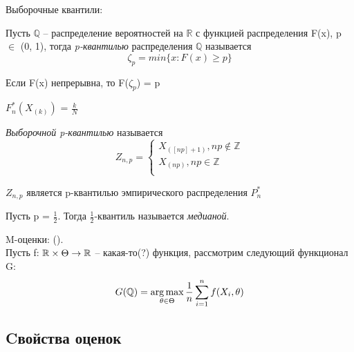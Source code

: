 \begin{example}
Выборочные квантили: 
\begin{definition}
Пусть $\mathbb{Q}$ -- распределение вероятностей на $\mathbb{R}$ с функцией распределения F(x), p $\in$ (0, 1), тогда \emph{p-квантилью} распределения $\mathbb{Q}$ называется 
$$ \zeta_p = min\{x: F(x) \geq p\}$$

\begin{remark}
Если F(x) непрерывна, то F($\zeta_p$) = p
\end{remark}

\begin{remark}
$F^{*}_{n}(X_{(k)})$ = $\frac{k}{N}$
\end{remark}
\end{definition}

\begin{definition}
\emph{Выборочной p-квантилью} называется
$$Z_{n,p} =
\begin{cases}
X_{([np] + 1)}, np \notin \mathbb{Z} \\
X_{(np)}, np \in \mathbb{Z} \\
\end{cases}
$$

\begin{remark}
$Z_{n,p}$ является p-квантилью эмпирического распределения $P^{*}_n$
\end{remark}
\end{definition}
\begin{definition}
Пусть p = $\frac{1}{2}$. Тогда $\frac{1}{2}$-квантиль называется \emph{медианой}.
\end{definition}
\end{example}

\begin{example}
M-оценки: ().\\
Пусть f: $\mathbb{R} \times \Theta \to \mathbb{R}$ -- какая-то(?) функция, рассмотрим следующий функционал G:
$$ G(\mathbb{Q}) = \operatorname*{arg\,max}_{\theta \in \Theta}\frac{1}{n}\sum_{i = 1}^{n}f(X_i, \theta)
$$
\end{example}

\subsection{Cвойства оценок}
